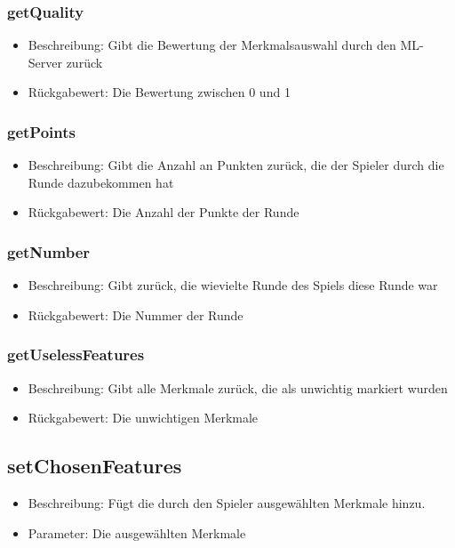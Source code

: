\documentclass[a4paper]{scrreprt}
\begin{document}
   \subsubsection{getQuality}
      \begin{itemize}
          \item Beschreibung: Gibt die Bewertung der Merkmalsauswahl durch den ML-Server zurück
          \item Rückgabewert: Die Bewertung zwischen 0 und 1
      \end{itemize}
   \subsubsection{getPoints}
      \begin{itemize}
          \item Beschreibung: Gibt die Anzahl an Punkten zurück, die der Spieler durch die Runde dazubekommen hat
          \item Rückgabewert: Die Anzahl der Punkte der Runde
      \end{itemize}
   \subsubsection{getNumber}
      \begin{itemize}
          \item Beschreibung: Gibt zurück, die wievielte Runde des Spiels diese Runde war
          \item Rückgabewert: Die Nummer der Runde
      \end{itemize}
   \subsubsection{getUselessFeatures}
      \begin{itemize}
          \item Beschreibung: Gibt alle Merkmale zurück, die als unwichtig markiert wurden
          \item Rückgabewert: Die unwichtigen Merkmale
      \end{itemize}
   \subsection{setChosenFeatures}
      \begin{itemize}
      \item Beschreibung: Fügt die durch den Spieler ausgewählten Merkmale hinzu.
      \item Parameter: Die ausgewählten Merkmale
      \end{itemize}
\end{document}
